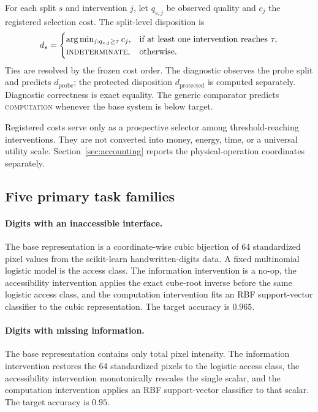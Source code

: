 \documentclass[10pt]{article}
\newcommand{\Compute}{\textsc{computation}}
\newcommand{\Indeterminate}{\textsc{indeterminate}}
\begin{document}
For each split $s$ and intervention $j$, let $q_{s,j}$ be observed quality and $c_j$ the registered selection cost. The split-level disposition is
\[
d_s =
\begin{cases}
\arg\min_{j:q_{s,j}\geq\tau} c_j, & \text{if at least one intervention reaches }\tau,\\
\Indeterminate, & \text{otherwise.}
\end{cases}
\]
Ties are resolved by the frozen cost order. The diagnostic observes the probe split and predicts $d_{\mathrm{probe}}$; the protected disposition $d_{\mathrm{protected}}$ is computed separately. Diagnostic correctness is exact equality. The generic comparator predicts \Compute{} whenever the base system is below target.

Registered costs serve only as a prospective selector among threshold-reaching interventions. They are not converted into money, energy, time, or a universal utility scale. Section~\ref{sec:accounting} reports the physical-operation coordinates separately.

\subsection{Five primary task families}

\paragraph{Digits with an inaccessible interface.}
The base representation is a coordinate-wise cubic bijection of 64 standardized pixel values from the scikit-learn handwritten-digits data. A fixed multinomial logistic model is the access class. The information intervention is a no-op, the accessibility intervention applies the exact cube-root inverse before the same logistic access class, and the computation intervention fits an RBF support-vector classifier to the cubic representation. The target accuracy is $0.965$.

\paragraph{Digits with missing information.}
The base representation contains only total pixel intensity. The information intervention restores the 64 standardized pixels to the logistic access class, the accessibility intervention monotonically rescales the single scalar, and the computation intervention applies an RBF support-vector classifier to that scalar. The target accuracy is $0.95$.
\end{document}
